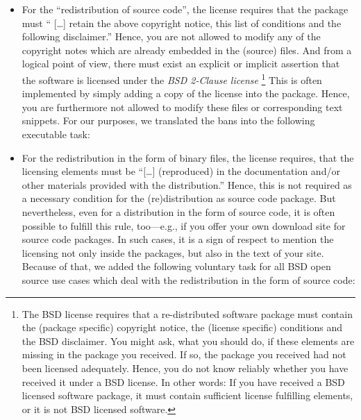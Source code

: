 \begin{itemize}
\item For the \enquote{redistribution of source code}, the license requires
  that the package must \enquote{ [\ldots] retain the above copyright notice,
  this list of conditions and the following disclaimer.}\citeBSDsimple{}
  Hence, you are not allowed to modify any of the copyright notes which are
  already embedded in the (source) files. And from a logical point of view,
  there must exist an explicit or implicit assertion that the software is
  licensed under the \textit{BSD 2-Clause license}%
  \footnote{The BSD license requires that a re-distributed software package must 
    contain the (package specific) copyright notice, the (license specific)
    conditions and the BSD disclaimer.\cite[cf.][\nopage wp]{BsdLicense2Clause} 
    You might ask, what you should do, if these elements are missing in the
    package you received. If so, the package you received had not been licensed
    adequately. Hence, you do not know reliably whether you have received it
    under a BSD license. In other words: If you have received a BSD licensed
    software package, it must contain sufficient license fulfilling elements, or
    it is not BSD licensed software.} 
  This is often implemented by simply adding a copy of the license into the
  package. Hence, you are furthermore not allowed to modify these files or
  corresponding text snippets. For our purposes, we translated the bans into the
  following executable task: 

\begin{quote}\textit{\keepLicenseElements}\end{quote}

\item For the redistribution in the form of binary files, the license requires,
  that the licensing elements must be \enquote{[\ldots] (reproduced) in the
  documentation and/or other materials provided with the distribution.}%
  \citeBSDsimple{}
  Hence, this is not required as a necessary condition for the (re)distribution
  as source code package. But nevertheless, even for a distribution in the form
  of source code, it is often possible to fulfill this rule, too---e.g., if you
  offer your own download site for source code packages.  In such cases, it is a
  sign of respect to mention the licensing not only inside the packages, but
  also in the text of your site. Because of that, we added the following
  voluntary task for all BSD open source use cases which deal with the
  redistribution in the form of source code: 


\end{itemize}
